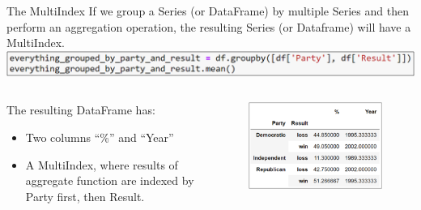 \documentclass[aspectratio=169]{../latex_main/tntbeamer}  %
\begin{document}
    
    \begin{frame}{The MultiIndex}
        If we group a Series (or DataFrame) by multiple Series and then perform an aggregation operation, the resulting Series (or Dataframe) will have a MultiIndex.\\
        \includegraphics[scale=.65]{Bild45}
        \begin{columns}
            \begin{column}{.4\textwidth}
                The resulting DataFrame has:
                \begin{itemize}
                    \item Two columns “\%” and “Year”
                    \item A MultiIndex, where results of aggregate function are indexed by Party first, then Result.
                \end{itemize}
            \end{column}
            \begin{column}{.55\textwidth}
                \begin{figure}
                    \includegraphics[scale=.54]{Bild46}
                \end{figure}
            \end{column}
        \end{columns}
    \end{frame}
\end{document}
